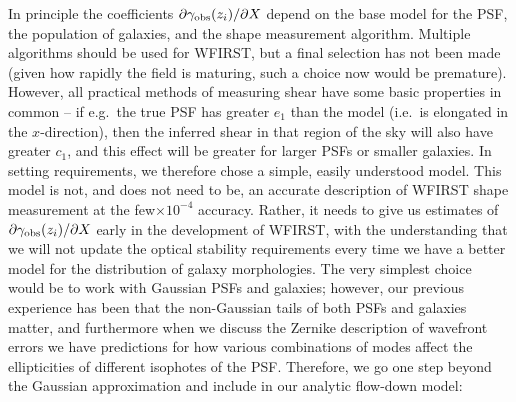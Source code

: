 \documentclass[aps,prd, amsmath,amssymb,superscriptaddress,showkeys,nofootinbib,reprint,preprintnumbers]{revtex4-1}
\begin{document}
In principle the coefficients $\partial\gamma_{\rm obs}(z_i)/\partial X$ depend on the base model for the PSF, the population of galaxies, and the shape measurement algorithm. Multiple algorithms should be used for WFIRST, but a final selection has not been made (given how rapidly the field is maturing, such a choice now would be premature). However, all practical methods of measuring shear have some basic properties in common -- if e.g.\ the true PSF has greater $e_1$ than the model (i.e.\ is elongated in the $x$-direction), then the inferred shear in that region of the sky will also have greater $c_1$, and this effect will be greater for larger PSFs or smaller galaxies. In setting requirements, we therefore chose a simple, easily understood model. This model is not, and does not need to be, an accurate description of WFIRST shape measurement at the few$\times 10^{-4}$ accuracy. Rather, it needs to give us estimates of $\partial\gamma_{\rm obs}(z_i)/\partial X$ early in the development of WFIRST, with the understanding that we will not update the optical stability requirements every time we have a better model for the distribution of galaxy morphologies. The very simplest choice would be to work with Gaussian PSFs and galaxies; however, our previous experience has been that the non-Gaussian tails of both PSFs and galaxies matter, and furthermore when we discuss the Zernike description of wavefront errors we have predictions for how various combinations of modes affect the ellipticities of different isophotes of the PSF. Therefore, we go one step beyond the Gaussian approximation and include in our analytic flow-down model:
\end{document}
